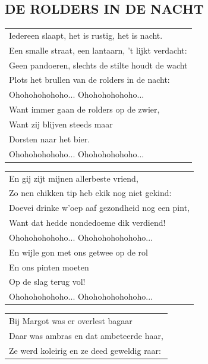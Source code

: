 \documentclass[a4paper, 14pt]{extarticle}
\begin{document}
\subsection*{DE ROLDERS IN DE NACHT}
\begin{flushleft}
\begin{tabularx}{0.8\textwidth} {
   >{\raggedright\arraybackslash}X}
Iedereen slaapt, het is rustig, het is nacht.\\
Een smalle straat, een lantaarn, ’t lijkt verdacht:\\
Geen pandoeren, slechts de stilte houdt de wacht\\
Plots het brullen van de rolders in de nacht:\\
Ohohohohohoho... Ohohohohohoho...\\
Want immer gaan de rolders op de zwier,\\
Want zij blijven steeds maar\\
Dorsten naar het bier.\\
Ohohohohohoho... Ohohohohohoho...\\
\end{tabularx}
\end{flushleft}\begin{flushleft}
\begin{tabularx}{0.8\textwidth} {
   >{\raggedright\arraybackslash}X}
En gij zijt mijnen allerbeste vriend,\\
Zo nen chikken tip heb ekik nog niet gekind:\\
Doevei drinke w’oep aaf gezondheid nog een pint,\\
Want dat hedde nondedoeme dik verdiend!\\
Ohohohohohoho... Ohohohohohohoho...\\
En wijle gon met ons getwee op de rol\\
En ons pinten moeten\\
Op de slag terug vol!\\
Ohohohohohoho... Ohohohohohohoho...\\
\end{tabularx}
\end{flushleft}\begin{flushleft}
\begin{tabularx}{0.8\textwidth} {
   >{\raggedright\arraybackslash}X}
Bij Margot was er overlest bagaar\\
Daar was ambras en dat ambeteerde haar,\\
Ze werd koleirig en ze deed geweldig raar:\\

\end{tabularx}
\end{flushleft}
\end{document}

